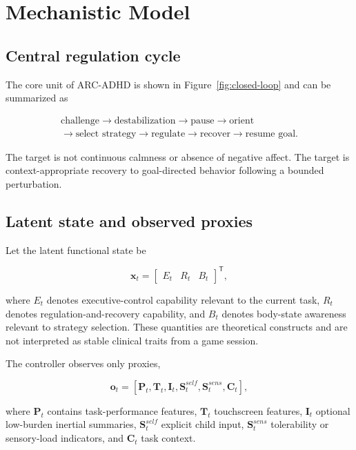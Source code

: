 \section{Mechanistic Model}

\subsection{Central regulation cycle}

The core unit of ARC-ADHD is shown in Figure~\ref{fig:closed-loop} and can be summarized as

\[
\begin{gathered}
\text{challenge}
\rightarrow
\text{destabilization}
\rightarrow
\text{pause}
\rightarrow
\text{orient}\\
\rightarrow
\text{select strategy}
\rightarrow
\text{regulate}
\rightarrow
\text{recover}
\rightarrow
\text{resume goal}.
\end{gathered}
\]



The target is not continuous calmness or absence of negative affect. The target is context-appropriate recovery to goal-directed behavior following a bounded perturbation.

\subsection{Latent state and observed proxies}

Let the latent functional state be

\[
\mathbf{x}_t =
\begin{bmatrix}
E_t & R_t & B_t
\end{bmatrix}^{\mathsf T},
\]

where \(E_t\) denotes executive-control capability relevant to the current task, \(R_t\) denotes regulation-and-recovery capability, and \(B_t\) denotes body-state awareness relevant to strategy selection. These quantities are theoretical constructs and are not interpreted as stable clinical traits from a game session.

The controller observes only proxies,

\[
\mathbf{o}_t =
\left[
\mathbf{P}_t,
\mathbf{T}_t,
\mathbf{I}_t,
\mathbf{S}^{self}_t,
\mathbf{S}^{sens}_t,
\mathbf{C}_t
\right],
\]

where \(\mathbf{P}_t\) contains task-performance features, \(\mathbf{T}_t\) touchscreen features, \(\mathbf{I}_t\) optional low-burden inertial summaries, \(\mathbf{S}^{self}_t\) explicit child input, \(\mathbf{S}^{sens}_t\) tolerability or sensory-load indicators, and \(\mathbf{C}_t\) task context.


